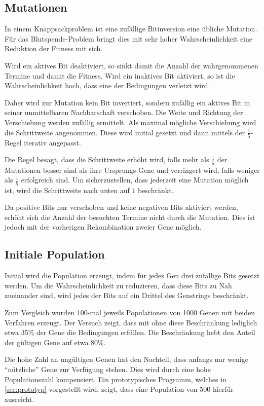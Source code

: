 \subsection{Mutationen}
In einem Knappsackproblem ist eine zufällige Bitinversion eine übliche Mutation.
Für das Blutspende-Problem bringt dies mit sehr hoher Wahrscheinlichkeit
eine Reduktion der Fitness mit sich.

Wird ein aktives Bit deaktiviert, so sinkt damit die Anzahl der wahrgenommenen Termine und damit die Fitness.
Wird ein inaktives Bit aktiviert, so ist die Wahrscheinlichkeit hoch, dass eine der Bedingungen verletzt wird.

Daher wird zur Mutation kein Bit invertiert, sondern zufällig ein aktives Bit in seiner unmittelbaren Nachbarschaft verschoben.
Die Weite und Richtung der Verschiebung werden zufällig ermittelt. Als maximal mögliche Verschiebung wird die Schrittweite angenommen.
Diese wird initial gesetzt und dann mittels der $\frac{1}{5}$-Regel iterativ angepasst.

Die Regel besagt, dass die Schrittweite erhöht wird, falls mehr als $\frac{1}{5}$ der Mutationen besser sind als ihre Ursprungs-Gene
und verringert wird, falls weniger als $\frac{1}{5}$ erfolgreich sind.
Um sicherzustellen, dass jederzeit eine Mutation möglich ist, wird die Schrittweite nach unten auf $1$ beschränkt.

Da positive Bits nur verschoben und keine negativen Bits aktiviert werden,
erhöht sich die Anzahl der besuchten Termine nicht durch die Mutation.
Dies ist jedoch mit der vorherigen Rekombination zweier Gene möglich.

\subsection{Initiale Population}
Initial wird die Population erzeugt,
indem für jedes Gen drei zufällige Bits gesetzt werden.
Um die Wahrscheinlichkeit zu reduzieren, dass diese Bits zu Nah zueinander sind,
wird jedes der Bits auf ein Drittel des Genstrings beschränkt.

Zum Vergleich wurden 100-mal jeweils Populationen von 1000 Genen mit beiden Verfahren erzeugt.
Der Versuch zeigt, dass mit ohne diese Beschränkung lediglich etwa 35\% der Gene die Bedingungen erfüllen.
Die Beschränkung hebt den Anteil der gültigen Gene auf etwa 80\%.

Die hohe Zahl an ungültigen Genen hat den Nachteil,
dass anfangs nur wenige \enquote{nützliche} Gene zur Verfügung stehen.
Dies wird durch eine hohe Populationszahl kompensiert.
Ein prototypisches Programm, welches in \autoref{sec:prototyp} vorgestellt wird,
zeigt, dass eine Population von 500 hierfür ausreicht.

